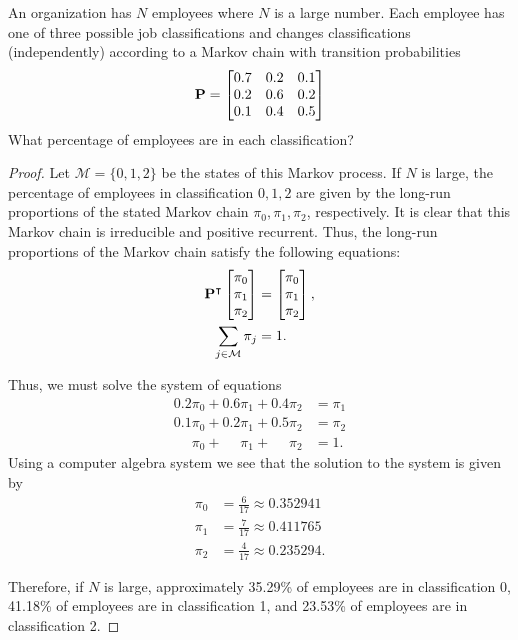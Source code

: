 \begin{problem}{4.29}
  An organization has $N$ employees where $N$ is a large number. Each employee
  has one of three possible job classifications and changes classifications (independently)
  according to a Markov chain with transition probabilities
  \begin{align*}
    \bold{P} =
    \begin{bmatrix}
      0.7 & 0.2 & 0.1 \\
      0.2 & 0.6 & 0.2 \\
      0.1 & 0.4 & 0.5
    \end{bmatrix}
  \end{align*}
  What percentage of employees are in each classification?
\end{problem}

\begin{proof}
  Let $\mathcal{M} = \{0,1,2\}$ be the states of this Markov process.
  If $N$ is large, the percentage of employees in classification $0, 1, 2$ are given by the long-run
  proportions of the stated Markov chain $\pi_0, \pi_1, \pi_2$, respectively.
  It is clear that this Markov chain is irreducible and positive recurrent. Thus, the long-run
  proportions of the Markov chain satisfy the following equations:
  \begin{align*}
     \bold{P}^\intercal \begin{bmatrix} \pi_0 \\ \pi_1 \\ \pi_2 \\ \end{bmatrix} &= \begin{bmatrix} \pi_0 \\ \pi_1 \\ \pi_2 \\\end{bmatrix},\\
     \sum_{j\in \mathcal{M}} \pi_j &= 1.
  \end{align*}

  Thus, we must solve the system of equations
  \begin{align*}
    0.2 \pi_0 + 0.6 \pi_1 + 0.4 \pi_2 &= \pi_1 \\
    0.1 \pi_0 + 0.2 \pi_1 + 0.5 \pi_2 &= \pi_2 \\
    \phantom{0.1} \pi_0 + \phantom{0.1}\pi_1 + \phantom{0.1} \pi_2 &= 1.
  \end{align*}
  Using a computer algebra system we see that the solution to the system is given
  by
  \begin{align*}
    \pi_0 &= \frac{6}{17} \approx 0.352941 \\
    \pi_1 &= \frac{7}{17} \approx 0.411765 \\
    \pi_2 &= \frac{4}{17} \approx 0.235294.
  \end{align*}

  Therefore, if $N$ is large, approximately 35.29\% of employees are in classification 0,
  41.18\% of employees are in classification 1, and 23.53\% of employees are in classification 2.
\end{proof}
\newpage
